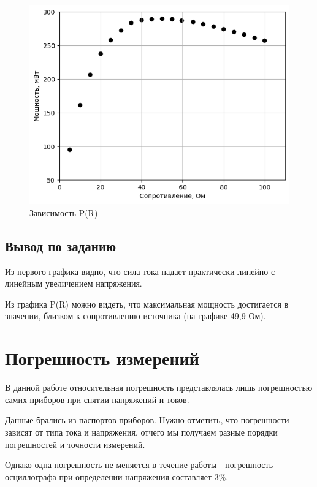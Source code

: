 \documentclass[a4paper,12pt]{article}
\begin{document}
\begin{figure}[ht!]
    \centering
    \includegraphics[scale=1]{4_1.png}
    \caption{Зависимость P(R)}
    \label{fig:enter-label}
\end{figure}

\clearpage

\subsection{Вывод по заданию}
\hspace{\parindent}Из первого графика видно, что сила тока падает практически линейно с линейным увеличением напряжения. 

Из графика P(R) можно видеть, что максимальная мощность достигается в значении, близком к сопротивлению источника (на графике 49,9  \hspace{5pt}Ом).



\section{Погрешность измерений}
\hspace{\parindent}В данной работе относительная погрешность представлялась лишь погрешностью самих приборов при снятии напряжений и токов.

Данные брались из паспортов приборов. Нужно отметить, что погрешности зависят от типа тока и напряжения, отчего мы получаем разные порядки погрешностей и точности измерений.

Однако одна погрешность не меняется в течение работы - погрешность осциллографа при определении напряжения составляет 3\%.
\end{document}
